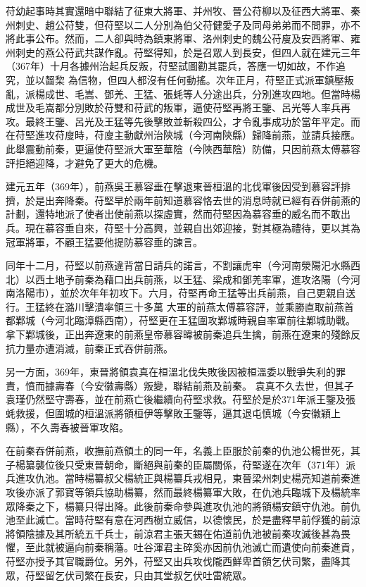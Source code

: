 苻幼起事時其實還暗中聯結了征東大將軍、并州牧、晉公苻柳以及征西大將軍、秦州刺史、趙公苻雙，但苻堅以二人分別為伯父苻健愛子及同母弟弟而不問罪，亦不將此事公布。然而，二人卻與時為鎮東將軍、洛州刺史的魏公苻廋及安西將軍、雍州刺史的燕公苻武共謀作亂。苻堅得知，於是召眾人到長安，但四人就在建元三年（367年）十月各據州治起兵反叛，苻堅試圖勸其罷兵，答應一切如故，不作追究，並以齧棃 為信物，但四人都沒有任何動搖。次年正月，苻堅正式派軍鎮壓叛亂，派楊成世、毛嵩、鄧羌、王猛、張蚝等人分途出兵，分別進攻四地。但當時楊成世及毛嵩都分別敗於苻雙和苻武的叛軍，逼使苻堅再將王鑒、呂光等人率兵再攻。最終王鑒、呂光及王猛等先後擊敗並斬殺四公，才令亂事成功於當年平定。而在苻堅進攻苻廋時，苻廋主動獻州治陝城（今河南陝縣）歸降前燕，並請兵接應。此舉震動前秦，更逼使苻堅派大軍至華陰（今陝西華陰）防備，只因前燕太傅慕容評拒絕迎降，才避免了更大的危機。

建元五年（369年），前燕吳王慕容垂在擊退東晉桓溫的北伐軍後因受到慕容評排擠，於是出奔降秦。苻堅早於兩年前知道慕容恪去世的消息時就已經有吞併前燕的計劃，還特地派了使者出使前燕以探虛實，然而苻堅因為慕容垂的威名而不敢出兵。現在慕容垂自來，苻堅十分高興，並親自出郊迎接，對其極為禮待，更以其為冠軍將軍，不顧王猛要他提防慕容垂的諫言。

同年十二月，苻堅以前燕違背當日請兵的諾言，不割讓虎牢（今河南滎陽汜水縣西北）以西土地予前秦為藉口出兵前燕，以王猛、梁成和鄧羌率軍，進攻洛陽（今河南洛陽市），並於次年年初攻下。六月，苻堅再命王猛等出兵前燕，自己更親自送行。王猛終在潞川擊潰率領三十多萬 大軍的前燕太傅慕容評，並乘勝直取前燕首都鄴城（今河北臨漳縣西南），苻堅更在王猛圍攻鄴城時親自率軍前往鄴城助戰。拿下鄴城後，正出奔遼東的前燕皇帝慕容暐被前秦追兵生擒，前燕在遼東的殘餘反抗力量亦遭消滅，前秦正式吞併前燕。

另一方面，369年，東晉將領袁真在桓溫北伐失敗後因被桓溫委以戰爭失利的罪責，憤而據壽春（今安徽壽縣）叛變，聯結前燕及前秦。 袁真不久去世，但其子袁瑾仍然堅守壽春，並在前燕亡後繼續向苻堅求救。苻堅於是於371年派王鑒及張蚝救援，但圍城的桓溫派將領桓伊等擊敗王鑒等，逼其退屯慎城（今安徽穎上縣），不久壽春被晉軍攻陷。

在前秦吞併前燕，收撫前燕領土的同一年，名義上臣服於前秦的仇池公楊世死，其子楊纂襲位後只受東晉朝命，斷絕與前秦的臣屬關係，苻堅遂在次年（371年）派兵進攻仇池。當時楊纂叔父楊統正與楊纂兵戎相見，東晉梁州刺史楊亮知道前秦進攻後亦派了郭寶等領兵協助楊纂，然而最終楊纂軍大敗，在仇池兵臨城下及楊統率眾降秦之下，楊纂只得出降。此後前秦命參與進攻仇池的將領楊安鎮守仇池。前仇池至此滅亡。當時苻堅有意在河西樹立威信，以德懷民，於是盡釋早前俘獲的前涼將領陰據及其所統五千兵士，前涼君主張天錫在佑道前仇池被前秦攻滅後甚為畏懼，至此就被逼向前秦稱藩。吐谷渾君主碎奚亦因前仇池滅亡而遺使向前秦進貢，苻堅亦授予其官職爵位。另外，苻堅又出兵攻伐隴西鮮卑首領乞伏司繁，盡降其眾，苻堅留乞伏司繁在長安，只由其堂叔乞伏吐雷統眾。

